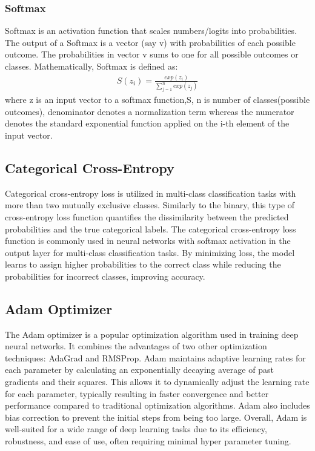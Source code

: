 \subsubsection{Softmax}
\vspace{-18pt}
Softmax is an activation function that scales numbers/logits into probabilities. The output of a Softmax is a vector (say v) with probabilities of each possible outcome. The probabilities in vector v sums to one for all possible outcomes or classes. Mathematically, Softmax is defined as: 
\begin{eqnarray}
	S(z_{i}) = \frac{exp(z_{i})}{\sum_{j=1}^{n} exp(z_{j})}
\end{eqnarray}
where z is an input vector to a softmax function,S, n is number of classes(possible outcomes), denominator denotes a normalization term whereas the numerator denotes the standard exponential function applied on the i-th element of the input vector.
\subsection{Categorical Cross-Entropy}
\vspace{-18pt}
Categorical cross-entropy loss is utilized in multi-class classification tasks with more than two mutually exclusive classes. Similarly to the binary, this type of cross-entropy loss function quantifies the dissimilarity between the predicted probabilities and the true categorical labels. The categorical cross-entropy loss function is commonly used in neural networks with softmax activation in the output layer for multi-class classification tasks. By minimizing loss, the model learns to assign higher probabilities to the correct class while reducing the probabilities for incorrect classes, improving accuracy.
\subsection{Adam Optimizer}
\vspace{-18pt}
The Adam optimizer is a popular optimization algorithm used in training deep neural networks. It combines the advantages of two other optimization techniques: AdaGrad and RMSProp. Adam maintains adaptive learning rates for each parameter by calculating an exponentially decaying average of past gradients and their squares. This allows it to dynamically adjust the learning rate for each parameter, typically resulting in faster convergence and better performance compared to traditional optimization algorithms. Adam also includes bias correction to prevent the initial steps from being too large. Overall, Adam is well-suited for a wide range of deep learning tasks due to its efficiency, robustness, and ease of use, often requiring minimal hyper parameter tuning.

